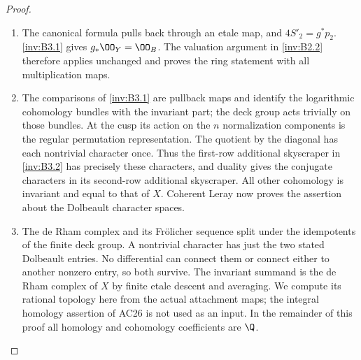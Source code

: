 \begin{proof}
\begin{enumerate}[label={$\langle1\rangle$\arabic*.},leftmargin=*]
\item The canonical formula pulls back through an etale map, and
$4S'_2=g^*p_2$. \ref{inv:B3.1} gives $g_*\OO_Y=\OO_B$.
The valuation argument in \ref{inv:B2.2} therefore applies unchanged and proves
the ring statement with all multiplication maps.

\item The comparisons of \ref{inv:B3.1} are pullback maps and identify the logarithmic
cohomology bundles with the invariant part; the deck group acts
trivially on those bundles. At the cusp its action on the $n$
normalization components is the regular permutation representation.
The quotient by the diagonal has each nontrivial character once.
Thus the first-row additional skyscraper in \ref{inv:B3.2} has precisely these
characters, and duality gives the conjugate characters in its
second-row additional skyscraper. All other cohomology is invariant
and equal to that of $X$. Coherent Leray now proves the assertion
about the Dolbeault character spaces.

\item The de Rham complex and its Fr\"olicher sequence split under the
idempotents of the finite deck group. A nontrivial character has just
the two stated Dolbeault entries. No differential can connect them
or connect either to another nonzero entry, so both survive.
The invariant summand is the de Rham complex of $X$ by finite
etale descent and averaging. We compute its rational topology here
from the actual attachment maps; the integral homology assertion
of AC26 is not used as an input. In the remainder of this proof
all homology and cohomology coefficients are $\Q$.


\end{enumerate}
\end{proof}
